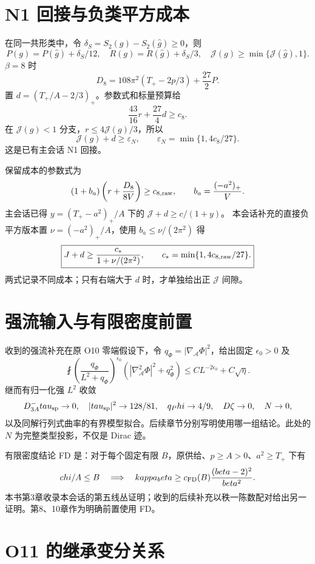 \documentclass[UTF8,11pt,openany,oneside,fontset=none]{ctexbook}
\begin{document}
\section{N1 回接与负类平方成本}\label{ch0:n1-ux56deux63a5ux4e0eux8d1fux7c7bux5e73ux65b9ux6210ux672c}

在同一共形类中，令 \(\delta_S=S_2(g)-S_2(\hat g)\ge0\)，则 \[
P(g)=P(\hat g)+\delta_S/12,\quad R(g)=R(\hat g)+\delta_S/3,
\quad\mathcal J(g)\ge\min\{\mathcal J(\hat g),1\}.
\] \(\beta=8\) 时 \[
D_8=108\pi^2(T_+-2p/3)+\frac{27}{2}P.
\] 置 \(d=(T_+/A-2/3)_+\)。参数式和标量预算给 \[
\frac{43}{16}r+\frac{27}{4}d\ge c_8.
\] 在 \(\mathcal J(g)<1\) 分支，\(r\le4\mathcal J(g)/3\)，所以 \[
\mathcal J(g)+d\ge\varepsilon_N,
\qquad\varepsilon_N=\min\{1,4c_8/27\}.
\] 这是已有主会话 N1 回接。\cite{N1}

保留成本的参数式为 \[
(1+b_a)\left(r+\frac{D_8}{8V}\right)\ge c_{8,\rm raw},
\qquad b_a=\frac{(-a^2)_+}{V}.
\] 主会话已得 \(y=(T_+-a^2)_+/A\) 下的 \(\mathcal J+d\ge c/(1+y)\)。 本会话补充的直接负平方版本置 \(\nu=(-a^2)_+/A\)，使用 \(b_a\le\nu/(2\pi^2)\) 得 \[
\boxed{\mathcal J+d\ge
\frac{c_*}{1+\nu/(2\pi^2)},\qquad
c_* =\min\{1,4c_{8,\rm raw}/27\}.}
\] 两式记录不同成本；只有右端大于 \(d\) 时，才单独给出正 \(\mathcal J\) 间隙。

\section{强流输入与有限密度前置}\label{ch0:ux5f3aux6d41ux8f93ux5165ux4e0eux6709ux9650ux5bc6ux5ea6ux524dux7f6e}

收到的强流补充在原 O10 零端假设下，令 \(q_\Phi=|\nabla_{\mathcal A}\Phi|^2\)，给出固定 \(\epsilon_0>0\) 及 \[
\fint\left(\frac{q_\Phi}{L^2+q_\Phi}\right)^{\epsilon_0}
\left(|\nabla_{\mathcal A}^2\Phi|^2+q_\Phi^2\right)
\le CL^{-2\epsilon_0}+C\sqrt\eta.
\] 继而有归一化强 \(L^2\) 收敛 \[
D^-_{3\mathcal A}\tau_{\rm sp}\to0,\quad
|\tau_{\rm sp}|^2\to128/81,\quad q_\Phi\to4/9,
\quad\nabla\zeta\to0,\quad N\to0,
\] 以及同解行列式曲率的有界模型拟合。后续章节分别写明使用哪一组结论。此处的 \(N\) 为完整类型投影，不仅是 Dirac 迹。\cite{Strong}

有限密度结论 FD 是：对于每个固定有限 \(B\)，原供给、\(p\ge A>0\)、\(a^2\ge T_+\) 下有 \[
\chi/A\le B\quad\Longrightarrow\quad
\kappa_\beta\ge c_{\rm FD}(B)\frac{(\beta-2)^2}{\beta^2}.
\] 本书第3章收录本会话的第五线丛证明；收到的后续补充以秩一陈数配对给出另一证明。第8、10章作为明确前置使用 FD。\cite{R03,FD}

\section{O11 的继承变分关系}\label{ch0:o11-ux7684ux7ee7ux627fux53d8ux5206ux5173ux7cfb}
\end{document}
